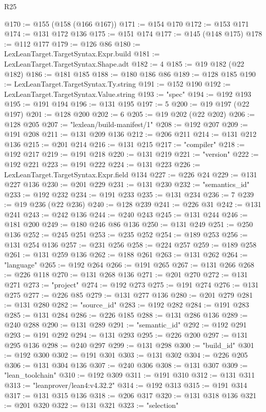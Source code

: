\begin{lexlean}{R25}
\begin{coremodule}
@170 := @155 (@158 (@166 @167))
@171 := @154 @170
@172 := @153 @171
@174 := @131 @172 @136
@175 := @151 @174
@177 := @145 (@148 @175)
@178 := @112 @177
@179 := @126 @86
@180 := LexLeanTarget.TargetSyntax.Expr.build
@181 := LexLeanTarget.TargetSyntax.Shape.adt
@182 := 4
@185 := @19 @182 (@22 @182)
@186 := @181 @185
@188 := @180 @186 @86
@189 := @128 @185
@190 := LexLeanTarget.TargetSyntax.Ty.string
@191 := @152 @190
@192 := LexLeanTarget.TargetSyntax.Value.string
@193 := "spec"
@194 := @192 @193
@195 := @191 @194
@196 := @131 @195
@197 := 5
@200 := @19 @197 (@22 @197)
@201 := @128 @200
@202 := 6
@205 := @19 @202 (@22 @202)
@206 := @128 @205
@207 := "lexlean/build-manifest/1"
@208 := @192 @207
@209 := @191 @208
@211 := @131 @209 @136
@212 := @206 @211
@214 := @131 @212 @136
@215 := @201 @214
@216 := @131 @215
@217 := "compiler"
@218 := @192 @217
@219 := @191 @218
@220 := @131 @219
@221 := "version"
@222 := @192 @221
@223 := @191 @222
@224 := @131 @223
@226 := LexLeanTarget.TargetSyntax.Expr.field @134
@227 := @226 @24
@229 := @131 @227 @136
@230 := @201 @229
@231 := @131 @230
@232 := "semantics_id"
@233 := @192 @232
@234 := @191 @233
@235 := @131 @234
@236 := 7
@239 := @19 @236 (@22 @236)
@240 := @128 @239
@241 := @226 @31
@242 := @131 @241
@243 := @242 @136
@244 := @240 @243
@245 := @131 @244
@246 := @181 @200
@249 := @180 @246 @86 @136
@250 := @131 @249
@251 := @250 @136
@252 := @245 @251
@253 := @235 @252
@254 := @189 @253
@256 := @131 @254 @136
@257 := @231 @256
@258 := @224 @257
@259 := @189 @258
@261 := @131 @259 @136
@262 := @188 @261
@263 := @131 @262
@264 := "language"
@265 := @192 @264
@266 := @191 @265
@267 := @131 @266
@268 := @226 @118
@270 := @131 @268 @136
@271 := @201 @270
@272 := @131 @271
@273 := "project"
@274 := @192 @273
@275 := @191 @274
@276 := @131 @275
@277 := @226 @85
@279 := @131 @277 @136
@280 := @201 @279
@281 := @131 @280
@282 := "source_id"
@283 := @192 @282
@284 := @191 @283
@285 := @131 @284
@286 := @226 @185
@288 := @131 @286 @136
@289 := @240 @288
@290 := @131 @289
@291 := "semantic_id"
@292 := @192 @291
@293 := @191 @292
@294 := @131 @293
@295 := @226 @200
@297 := @131 @295 @136
@298 := @240 @297
@299 := @131 @298
@300 := "build_id"
@301 := @192 @300
@302 := @191 @301
@303 := @131 @302
@304 := @226 @205
@306 := @131 @304 @136
@307 := @240 @306
@308 := @131 @307
@309 := "lean_toolchain"
@310 := @192 @309
@311 := @191 @310
@312 := @131 @311
@313 := "leanprover/lean4:v4.32.2"
@314 := @192 @313
@315 := @191 @314
@317 := @131 @315 @136
@318 := @206 @317
@320 := @131 @318 @136
@321 := @201 @320
@322 := @131 @321
@323 := "selection"

\end{coremodule}
\end{lexlean}
